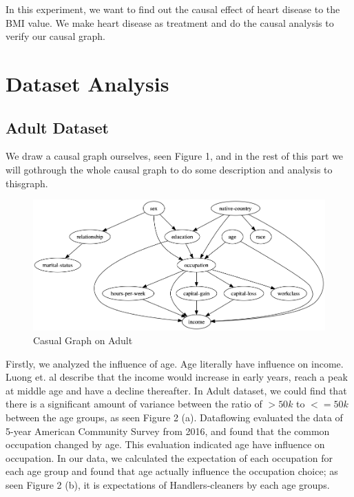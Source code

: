 \documentclass[letterpaper,12pt]{article}
\begin{document}
In this experiment, we want to find out the causal effect of heart disease to the BMI value. We make heart disease as treatment and do the causal analysis to verify our causal graph.\par


\section{Dataset Analysis}

\subsection{Adult Dataset}
We  draw  a  causal  graph  ourselves, seen Figure 1,  and  in  the  rest  of  this  part  we  will  gothrough the whole causal graph to do some description and analysis to thisgraph.\par
\begin{figure}[htb]
\centering
\includegraphics[scale=0.4]{pics_adult/adult_graph.png}
\caption{Casual Graph on Adult}
\label{fig:pathdemo}
\end{figure}


Firstly, we analyzed the influence of age. Age literally have influence on income. Luong et. al\cite{luong2009age} describe that the income would increase in early years, reach a peak at middle age and have a decline thereafter. In Adult dataset, we could find that there is a significant amount of variance between the ratio of $>50k$ to $<=50k$ between the age groups, as seen Figure 2 (a). Dataflowing\cite{occ-age} evaluated the data of 5-year American Community Survey from 2016, and found that the common occupation changed by age. This evaluation indicated age have influence on occupation. In our data, we calculated the expectation of each occupation for each age group and found that age actually influence the occupation choice; as seen Figure 2 (b), it is expectations of Handlers-cleaners by each age groups.\par
\end{document}
